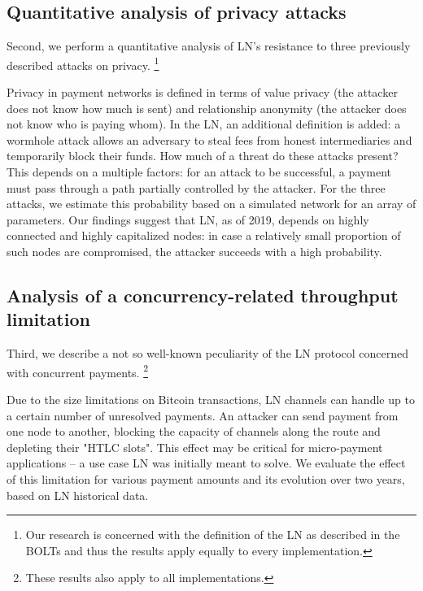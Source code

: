 \subsection{Quantitative analysis of privacy attacks}
Second, we perform a quantitative analysis of LN's resistance to three previously described attacks on privacy.
\footnote{Our research is concerned with the definition of the LN as described in the BOLTs and thus the results apply equally to every implementation.}

Privacy in payment networks is defined in terms of value privacy (the attacker does not know how much is sent) and relationship anonymity (the attacker does not know who is paying whom).
In the LN, an additional definition is added: a wormhole attack allows an adversary to steal fees from honest intermediaries and temporarily block their funds.
How much of a threat do these attacks present?
This depends on a multiple factors: for an attack to be successful, a payment must pass through a path partially controlled by the attacker.
For the three attacks, we estimate this probability based on a simulated network for an array of parameters.
Our findings suggest that LN, as of 2019, depends on highly connected and highly capitalized nodes: in case a relatively small proportion of such nodes are compromised, the attacker succeeds with a high probability.


\subsection{Analysis of a concurrency-related throughput limitation}
Third, we describe a not so well-known peculiarity of the LN protocol concerned with concurrent payments.
\footnote{These results also apply to all implementations.}

Due to the size limitations on Bitcoin transactions, LN channels can handle up to a certain number of unresolved payments.
An attacker can send payment from one node to another, blocking the capacity of channels along the route and depleting their "HTLC slots".
This effect may be critical for micro-payment applications -- a use case LN was initially meant to solve.
We evaluate the effect of this limitation for various payment amounts and its evolution over two years, based on LN historical data.





